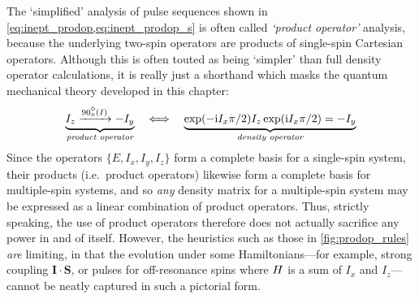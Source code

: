 The `simplified' analysis of pulse sequences shown in \cref{eq:inept_prodop,eq:inept_prodop_s} is often called \textit{`product operator'} analysis\autocite{Sorensen1984PNMRS}, because the underlying two-spin operators are products of single-spin Cartesian operators.
Although this is often touted as being `simpler' than full density operator calculations, it is really just a shorthand which masks the quantum mechanical theory developed in this chapter:
\begin{equation}
    \label{eq:product_operator_shorthand}
    \underbrace{I_z \xrightarrow{\angang{90}{x}(I)} -I_y}_{\textit{product operator}}
    \quad\Longleftrightarrow\quad
    \underbrace{\exp(-\mi I_x\pi/2)I_z\exp(\mi I_x\pi/2) = -I_y}_{\textit{density operator}}
\end{equation}
Since the operators $\{E, I_x, I_y, I_z\}$ form a complete basis for a single-spin system, their products (i.e.\ product operators) likewise form a complete basis for multiple-spin systems, and so \textit{any} density matrix for a multiple-spin system may be expressed as a linear combination of product operators.
Thus, strictly speaking, the use of product operators therefore does not actually sacrifice any power in and of itself.
However, the heuristics such as those in \cref{fig:prodop_rules} \textit{are} limiting, in that the evolution under some Hamiltonians---for example, strong coupling $\symbf{I}\cdot\symbf{S}$, or pulses for off-resonance spins where $H\/$ is a sum of $I_x$ and $I_z$---cannot be neatly captured in such a pictorial form.
